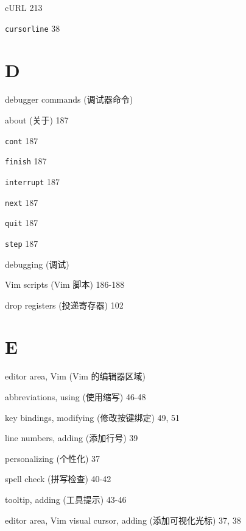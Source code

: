\begin{multicols}{2}
\hangindent=2pc  cURL 213

\hangindent=2pc  \texttt{cursorline} 38

\hangindent=2pc  \section*{D}

\hangindent=2pc  debugger commands (调试器命令) \par
\hangindent=2pc \quad about (关于) 187 \par
\hangindent=2pc \quad \texttt{cont} 187 \par
\hangindent=2pc \quad \texttt{finish} 187 \par
\hangindent=2pc \quad \texttt{interrupt} 187 \par
\hangindent=2pc \quad \texttt{next} 187 \par
\hangindent=2pc \quad \texttt{quit} 187 \par
\hangindent=2pc \quad \texttt{step} 187 \par

\hangindent=2pc  debugging (调试) \par
\hangindent=2pc \quad Vim scripts (Vim 脚本) 186-188 \par

\hangindent=2pc  drop registers (投递寄存器) 102

\hangindent=2pc  \section*{E}

\hangindent=2pc  editor area, Vim (Vim 的编辑器区域) \par
\hangindent=2pc \quad abbreviations, using (使用缩写) 46-48 \par
\hangindent=2pc \quad key bindings, modifying (修改按键绑定) 49, 51 \par
\hangindent=2pc \quad line numbers, adding (添加行号) 39 \par
\hangindent=2pc \quad personalizing (个性化) 37 \par
\hangindent=2pc \quad spell check (拼写检查) 40-42 \par
\hangindent=2pc \quad tooltip, adding (工具提示) 43-46 \par
\hangindent=2pc \quad editor area, Vim visual cursor, adding (添加可视化光标) 37, 38 \par


\end{multicols}
